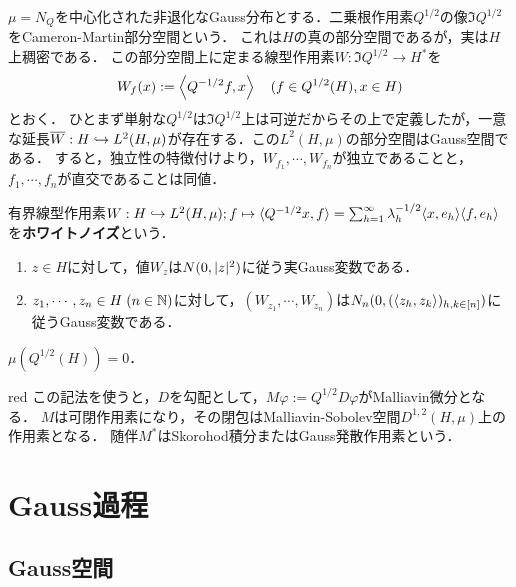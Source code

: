 \documentclass[uplatex,dvipdfmx]{jsreport}
\begin{document}
\begin{notation}
    $\mu=N_Q$を中心化された非退化なGauss分布とする．二乗根作用素$Q^{1/2}$の像$\Im Q^{1/2}$をCameron-Martin部分空間という．
    これは$H$の真の部分空間であるが，実は$H$上稠密である．
    この部分空間上に定まる線型作用素$W:\Im Q^{1/2}\to H^*$を
    \[W_f(x):=\left\langle Q^{-1/2}f,x\right\rangle\quad(f\in Q^{1/2}(H),x\in H)\]
    とおく．
    ひとまず単射な$Q^{1/2}$は$\Im Q^{1/2}$上は可逆だからその上で定義したが，一意な延長$\overline{W}:H\hookrightarrow L^2(H,\mu)$が存在する．この$L^2(H,\mu)$の部分空間はGauss空間である．
    すると，独立性の特徴付けより，$W_{f_1},\cdots,W_{f_n}$が独立であることと，$f_1,\cdots,f_n$が直交であることは同値．
\end{notation}

\begin{definition}\label{def-white-noise-1}
    有界線型作用素$W:H\hookrightarrow L^2(H,\mu);f\mapsto \langle Q^{-1/2}x,f\rangle=\sum_{h=1}^\infty\lambda_h^{-1/2}\langle x,e_h\rangle\langle f,e_h\rangle$
    を\textbf{ホワイトノイズ}という．
\end{definition}

\begin{proposition}\mbox{}
    \begin{enumerate}
        \item $z\in H$に対して，値$W_z$は$N(0,\lvert z\rvert^2)$に従う実Gauss変数である．
        \item $z_1,\cdots,z_n\in H\;(n\in\mathbb{N})$に対して，$(W_{z_1},\cdots,W_{z_n})$は$N_n(0,(\langle z_h,z_k\rangle)_{h,k\in[n]})$に従うGauss変数である．
    \end{enumerate}
\end{proposition}

\begin{proposition}
    $\mu(Q^{1/2}(H))=0$．
\end{proposition}

\begin{tbox}{red}{}
    この記法を使うと，$D$を勾配として，$M\varphi:=Q^{1/2}D\varphi$がMalliavin微分となる．
    $M$は可閉作用素になり，その閉包はMalliavin-Sobolev空間$D^{1,2}(H,\mu)$上の作用素となる．
    随伴$M^*$はSkorohod積分またはGauss発散作用素という．
\end{tbox}

\section{Gauss過程}

\subsection{Gauss空間}
\end{document}
